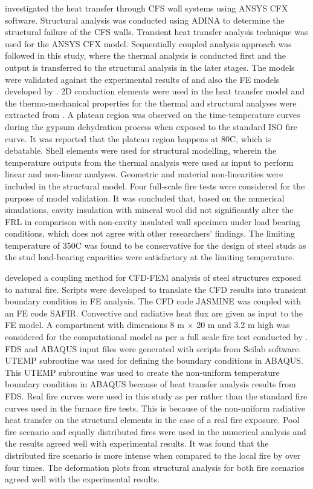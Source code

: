 \citet{Thanasoulas2016} investigated the heat transfer through CFS wall systems using ANSYS CFX software. Structural analysis was conducted using ADINA to determine the structural failure of the CFS walls. Transient heat transfer analysis technique was used for the ANSYS CFX model. Sequentially coupled analysis approach was followed in this study, where the thermal analysis is conducted first and the output is transferred to the structural analysis in the later stages. The models were validated against the experimental results of \citet{Gunalan2013e} and also the FE models developed by \citet{Gunalan2013f}. 2D conduction elements were used in the heat transfer model and the thermo-mechanical properties for the thermal and structural analyses were extracted from \citet{GhaziWakili2007,Kolaitis2013}. A plateau region was observed on the time-temperature curves during the gypsum dehydration process when exposed to the standard ISO fire curve. It was reported that the plateau region happens at 80\degree C, which is debatable. Shell elements were used for structural modelling, wherein the temperature outputs from the thermal analysis were used as input to perform linear and non-linear analyses. Geometric and material non-linearities were included in the structural model. Four full-scale fire tests were considered for the purpose of model validation. It was concluded that, based on the numerical simulations, cavity insulation with mineral wool did not significantly alter the FRL in comparison with non-cavity insulated wall specimen under load bearing conditions, which does not agree with other researchers' findings. The limiting temperature of 350\degree C was found to be conservative for the design of steel studs as the stud load-bearing capacities were satisfactory at the limiting temperature.      

\citet{Malendowski2017} developed a coupling method for CFD-FEM analysis of steel structures exposed to natural fire. Scripts were developed to translate the CFD results into transient boundary condition in FE analysis. The CFD code JASMINE was coupled with an FE code SAFIR. Convective and radiative heat flux are given as input to the FE model. A compartment with dimensions 8 m $\times$ 20 m and 3.2 m high was considered for the computational model as per a full scale fire test conducted by \citet{Pyl2012}. FDS and ABAQUS input files were generated with scripts from Scilab software. UTEMP subroutine was used for defining the boundary conditions in ABAQUS. This UTEMP subroutine was used to create the non-uniform temperature boundary condition in ABAQUS because of heat transfer analysis results from FDS. Real fire curves were used in this study as per \citet{Pyl2012} rather than the standard fire curves used in the furnace fire tests. This is because of the non-uniform radiative heat transfer on the structural elements in the case of a real fire exposure. Pool fire scenario and equally distributed fires were used in the numerical analysis and the results agreed well with experimental results. It was found that the distributed fire scenario is more intense when compared to the local fire by over four times. The deformation plots from structural analysis for both fire scenarios agreed well with the experimental results. 

